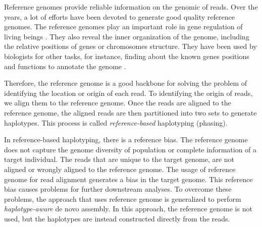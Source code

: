 Reference genomes provide reliable information on the genomic of reads. 
Over the years, a lot of efforts have been devoted to generate good quality reference genomes.
The reference genomes play an important role in gene regulation of living beings \citep{encode2004encode}. 
They also reveal the inner organization of the genome,
including the relative positions of genes or chromosomes structure. 
They have been used by biologists for other tasks, for instance, finding about the known genes
positions and functions to annotate the genome \citep{harrow2012gencode}.

Therefore, the reference genome is a good backbone for solving the problem of identifying the location or origin of each read.
To identifying the origin of reads, we align them to the reference genome. 
Once the reads are aligned to the reference genome, the aligned reads are then partitioned into two sets to generate haplotypes. This process is called \textit{reference-based} haplotyping (phasing).

In reference-based haplotyping, there is a reference bias. The reference genome does not capture the genome diversity of population or complete information of a target individual.
The reads that are unique to the target genome, are not aligned or wrongly aligned to the reference genome.
The usage of reference genome for read alignment generates a bias in the target genome. This reference bias causes problems for further downstream analyses. 
To overcome these problems, the approach that uses reference genome is generalized to perform \textit{haplotype-aware} de novo assembly.
In this approach, the reference genome is not used, but the haplotypes are instead constructed directly from the reads.

